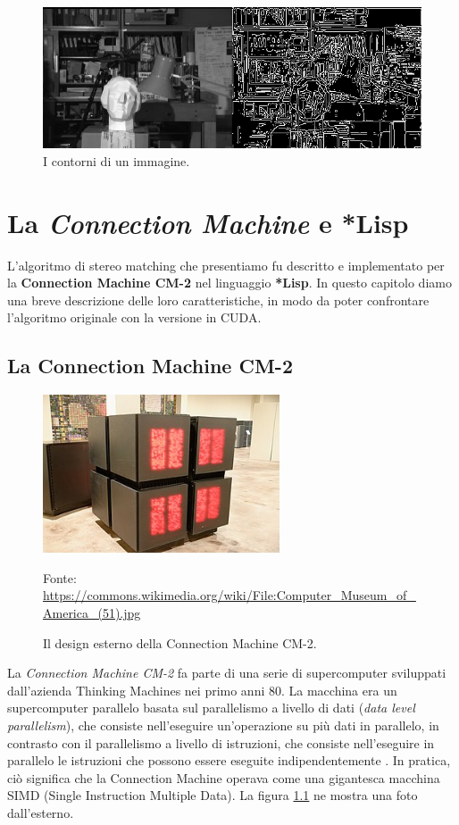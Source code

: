 \documentclass[12pt,a4paper,openright,twoside]{report}
\newcommand{\source}[1]{\vspace{-10pt} \caption*{\scriptsize Fonte: {#1}} }
\begin{document}
\begin{figure}[h]
    \centering
    \includegraphics[width=\textwidth]{contours.png}
    \caption{I contorni di un immagine.}
    \label{img:contours}
\end{figure}



\chapter{La \textit{Connection Machine} e *Lisp}

L'algoritmo di stereo matching che presentiamo fu descritto e implementato per la \textbf{Connection Machine CM-2} nel linguaggio \textbf{*Lisp}. In questo capitolo diamo una breve descrizione delle loro caratteristiche, in modo da poter confrontare l'algoritmo originale con la versione in CUDA.

\section{La Connection Machine CM-2}

\begin{figure}[h]
    \centering
    \includegraphics[width=7cm]{connection-machine.jpg}
    \caption{Il design esterno della Connection Machine CM-2.}
    \source{\url{https://commons.wikimedia.org/wiki/File:Computer_Museum_of_America_(51).jpg}}
    \label{img:connection_machine}
\end{figure}

La \textit{Connection Machine CM-2} fa parte di una serie di supercomputer sviluppati dall'azienda Thinking Machines nei primo anni 80. La macchina era un supercomputer parallelo basata sul parallelismo a livello di dati (\textit{data level parallelism}), che consiste nell'eseguire un'operazione su più dati in parallelo, in contrasto con il parallelismo a livello di istruzioni, che consiste nell'eseguire in parallelo le istruzioni che possono essere eseguite indipendentemente \cite{originalalgo}. In pratica, ciò significa che la Connection Machine operava come una gigantesca macchina SIMD (Single Instruction Multiple Data). La figura \ref{img:connection_machine} ne mostra una foto dall'esterno.
\end{document}
